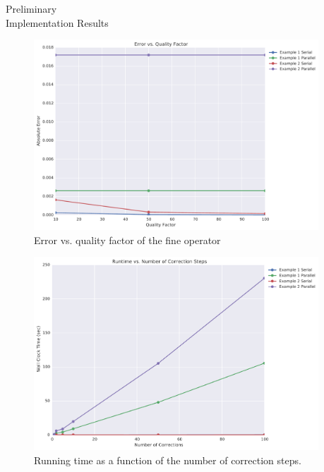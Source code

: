 \documentclass[final]{beamer}
\newlength{\sepwid}
\newlength{\onecolwid}
\begin{document}
\begin{frame}[t]
\begin{columns}[t]
\begin{column}{\onecolwid}
\begin{block}{Preliminary \\ Implementation Results}
\begin{figure}
\includegraphics[width=0.75\linewidth]{../data/error_vs_qualityfactor.pdf}
\caption{Error vs. quality factor of the fine operator}
\label{fig:err_v_q}
\end{figure}

\begin{figure}
\includegraphics[width=0.75\linewidth]{../data/runtime_vs_corrections.pdf}
\caption{Running time as a function of the number of correction steps.}
\label{fig:run_v_k}
\end{figure}

\end{block}


\end{column} %



\begin{column}{\sepwid}\end{column} %


\end{columns}
\end{frame}
\end{document}
